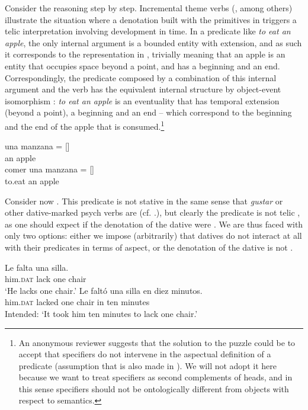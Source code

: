 \documentclass[output=paper,colorlinks,citecolor=brown,nonflat]{langsci/langscibook}
\begin{document}
Consider the reasoning step by step. Incremental theme verbs (\citealt{Tenny1987, Krifka1989}, among others) illustrate the situation where a denotation built with the primitives in  triggers a telic interpretation involving development in time. In a predicate like \textit{to eat an apple}, the only internal argument is a bounded entity with extension, and as such it corresponds to the representation in , trivially meaning that an apple is an entity that occupies space beyond a point, and has a beginning and an end. Correspondingly, the predicate  composed by a combination of this internal argument and the verb has the equivalent internal structure by object-event isomorphism \citep{Ramchand2008}: \textit{to eat an apple} is an eventuality that has temporal extension (beyond a point), a beginning and an end – which correspond to the beginning and the end of the apple that is consumed.\footnote{An anonymous reviewer suggests that the solution to the puzzle could be to accept that specifiers do not intervene in the aspectual definition of a predicate (assumption that is also made in \citealt{Ramchand2008}). We will not adopt it here because we want to treat specifiers as second complements of heads, and in this sense specifiers should not be ontologically different from objects with respect to semantics.}

\ea%
    \label{ex:fabregas:18}
    \ea\label{ex:fabregas:18a}
    \gll    una manzana       =       [{\midline}]\\
            {an}   {apple}\\
    \ex\label{ex:fabregas:18b}
    \gll    comer una manzana  =      [{\midline}]\\
            {to.eat}  {an}   {apple}\\
    \z
\z

Consider now . This predicate is not stative in the same sense that \textit{gustar} or other dative-marked psych verbs are (cf. .), but clearly the predicate is not telic , as one should expect if the denotation of the dative  were . We are thus faced with only two options: either we impose (arbitrarily) that datives do not interact at all with their predicates in terms of aspect, or the denotation of the dative is not .

\ea%
    \label{ex:fabregas:19}
    \ea\label{ex:fabregas:19a}
    \gll    Le       falta   una silla.\\
            {him.}\textsc{dat}  {lack}  {one} {chair}\\
    \glt `He lacks one chair.'
    \ex\label{ex:fabregas:19b}
    \gll    *Le           faltó     una silla  en diez minutos.\\
            him.\textsc{dat}    lacked  one chair in  ten  minutes\\
    \glt    Intended: `It took him ten minutes to lack one chair.'
    \z
\z
\end{document}
